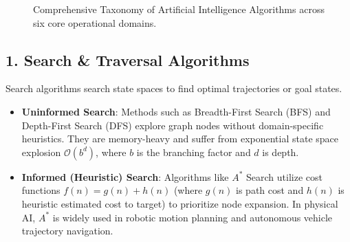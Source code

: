 \begin{figure}[htbp]
\caption{Comprehensive Taxonomy of Artificial Intelligence Algorithms across six core operational domains.}
\label{fig:ch01_ai_taxonomy}
\end{figure}

\subsection{1. Search \& Traversal Algorithms}
Search algorithms search state spaces to find optimal trajectories or goal states. 
\begin{itemize}[leftmargin=*]
    \item \textbf{Uninformed Search}: Methods such as Breadth-First Search (BFS) and Depth-First Search (DFS) explore graph nodes without domain-specific heuristics. They are memory-heavy and suffer from exponential state space explosion $\mathcal{O}(b^d)$, where $b$ is the branching factor and $d$ is depth.
    \item \textbf{Informed (Heuristic) Search}: Algorithms like $A^*$ Search utilize cost functions $f(n) = g(n) + h(n)$ (where $g(n)$ is path cost and $h(n)$ is heuristic estimated cost to target) to prioritize node expansion. In physical AI, $A^*$ is widely used in robotic motion planning and autonomous vehicle trajectory navigation.
\end{itemize}

